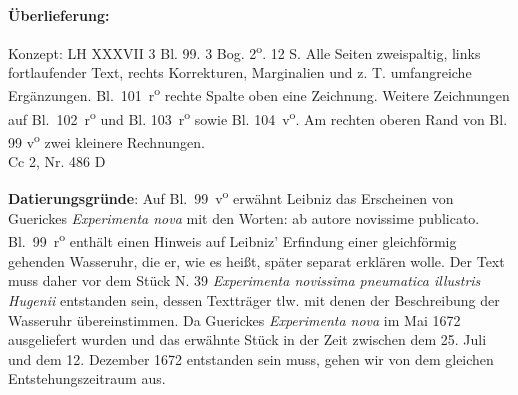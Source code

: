       
               
                \begin{ledgroupsized}[r]{120mm}
                \footnotesize 
                \pstart                
                \noindent\textbf{\"{U}berlieferung:}   
                \pend
                \end{ledgroupsized}
            
              
                            \begin{ledgroupsized}[r]{114mm}
                            \footnotesize 
                            \pstart \parindent -6mm
                            Konzept: LH XXXVII 3 Bl. 99. 3 Bog. 2\textsuperscript{o}. 12 S. Alle Seiten zweispaltig, links fortlaufender Text, rechts Korrekturen, Marginalien und z. T. umfangreiche Erg\"{a}nzungen. Bl.~101~r\textsuperscript{o} rechte Spalte oben eine Zeichnung. Weitere Zeichnungen auf Bl.~102~r\textsuperscript{o} und Bl. 103~r\textsuperscript{o} sowie Bl. 104~v\textsuperscript{o}. Am rechten oberen Rand von Bl. 99 v\textsuperscript{o} zwei kleinere Rechnungen.\\Cc 2, Nr. 486 D \pend
                            \end{ledgroupsized}
                \vspace*{5mm}
                \begin{ledgroup}
                \footnotesize 
                \pstart
            \noindent\footnotesize{\textbf{Datierungsgr\"{u}nde}: Auf Bl.~99~v\textsuperscript{o} erw\"{a}hnt Leibniz das Erscheinen von Guerickes \cite{00055}\textit{Experimenta nova} mit den Worten: ab autore novissime publicato. Bl.~99~r\textsuperscript{o} enth\"{a}lt einen Hinweis auf Leibniz' Erfindung einer gleichf\"{o}rmig gehenden Wasseruhr, die er, wie es heißt, sp\"{a}ter separat erkl\"{a}ren wolle. Der Text muss daher vor dem St\"{u}ck N. 39 \textit{Experimenta novissima pneumatica illustris Hugenii} entstanden sein, dessen Texttr\"{a}ger tlw. mit denen der Beschreibung der Wasseruhr \"{u}bereinstimmen. Da Guerickes \cite{00055}\textit{Experimenta nova} im Mai 1672 ausgeliefert wurden und das erw\"{a}hnte St\"{u}ck in der Zeit zwischen dem 25. Juli und dem 12. Dezember 1672 entstanden sein muss, gehen wir von dem gleichen Entstehungszeitraum aus.}
                \pend
                \end{ledgroup}
            

